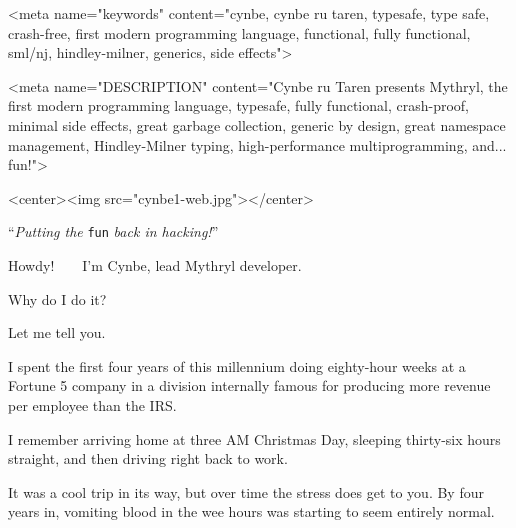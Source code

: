 

\title{}
\date{}
\author{}
\pagestyle{empty}

\maketitle
\thispagestyle{empty}

\begin{rawhtml}

<meta name="keywords" content="cynbe, cynbe ru taren, typesafe, type
  safe, crash-free, first modern programming language, functional,
  fully functional, sml/nj, hindley-milner, generics, side effects">

<meta name="DESCRIPTION" content="Cynbe ru Taren presents Mythryl, the
  first modern programming language, typesafe, fully functional,
  crash-proof, minimal side effects, great garbage collection, generic
  by design, great namespace management, Hindley-Milner typing,
  high-performance multiprogramming, and... fun!">

\end{rawhtml}



\begin{rawhtml}
<center><img src="cynbe1-web.jpg"></center>
\end{rawhtml}

\begin{center}
``{\em Putting the} {\tt fun} {\em back in hacking!}''
\end{center}


Howdy!~~~~I'm Cynbe, lead Mythryl developer.

Why do I do it?

Let me tell you.

I spent the first four years of this millennium doing eighty-hour
weeks at a Fortune 5 company in a division internally famous
for producing more revenue per employee than the IRS.

I remember arriving home at three {\sc AM} Christmas Day,
sleeping thirty-six hours straight, and then driving right back to work.

It was a cool trip in its way, but over time the stress does get to you.
By four years in, vomiting blood in the wee hours was starting
to seem entirely normal.


